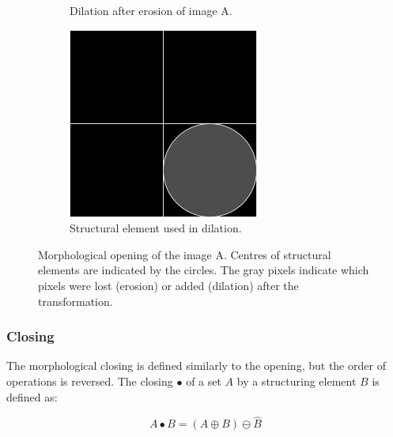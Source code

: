 \documentclass[
  digital,     %
  oneside,     %
  nosansbold,  %
  nocolorbold, %
  lof,         %
  lot,         %
]{fithesis4}
\begin{document}
\begin{figure}
\begin{subfigure}[t]{0.4\textwidth}
        \caption{Dilation after erosion of image A.}
        \label{fig:opening_dilation}
    \end{subfigure}
    \begin{subfigure}[t]{0.2\textwidth}
        \centering
        \includegraphics[width=\textwidth]{resources/inkscape/opening_dilation_se.png}
        \caption{Structural element used in dilation.}
        \label{fig:closing_dilation_se}
    \end{subfigure}
    \caption{Morphological opening of the image A. Centres of structural
    elements are indicated by the circles. The gray pixels indicate which pixels
    were lost (erosion) or added (dilation) after the transformation.}
    \label{fig:opening}
\end{figure}

\subsubsection{Closing}

The morphological closing is defined similarly to the opening, but the order of
operations is reversed. The closing $\bullet$ of a set $A$ by a structuring
element $B$ is defined as\cite{soile2004}: 

$$A \bullet B = (A \oplus B) \ominus \hat{B} $$
\end{document}
